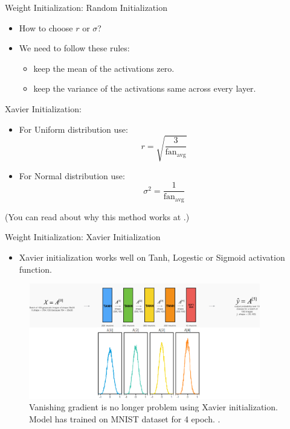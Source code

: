 \documentclass[compress,oilve,t]{beamer}
\newcommand{\tc}[2]{
	\textcolor{#1}{\hspace{-2pt}#2\hspace{-2pt}}
}
\begin{document}
\begin{frame}{Weight Initialization: Random Initialization}
	\begin{itemize}
		\item How to choose $r$ or $\sigma$?
		\item We need to follow these rules:
		\begin{itemize}
			\item keep the mean of the activations zero.
			\item keep the variance of the activations same across every layer.
		\end{itemize}
	\end{itemize}
	\begin{block}{Xavier Initialization:}
		\begin{itemize}
			\item For Uniform distribution use:
			\[
			r = \sqrt{\frac{3}{\text{fan}_\text{avg}}}
			\]
			\item For Normal distribution use:
			\[
			\sigma^2 = \frac{1}{\text{fan}_\text{avg}}
			\]
		\end{itemize}
		{\scriptsize (You can read about why this method works at \cite{katanforoosh-kunin}.)}
	\end{block}
\end{frame}

\begin{frame}{Weight Initialization: Xavier Initialization}
	\begin{itemize}
		\item Xavier initialization works well on \tc{keywords}{Tanh, Logestic or Sigmoid} activation function.
	\end{itemize}
	\begin{figure}[H]
		\centering
		\includegraphics[width=0.9\textwidth]{Figs/xavier-init.png}
		\caption{Vanishing gradient is no longer problem using Xavier initialization. Model has trained on MNIST dataset for 4 epoch. \cite{katanforoosh-kunin}.}
	\end{figure}
\end{frame}
\end{document}

